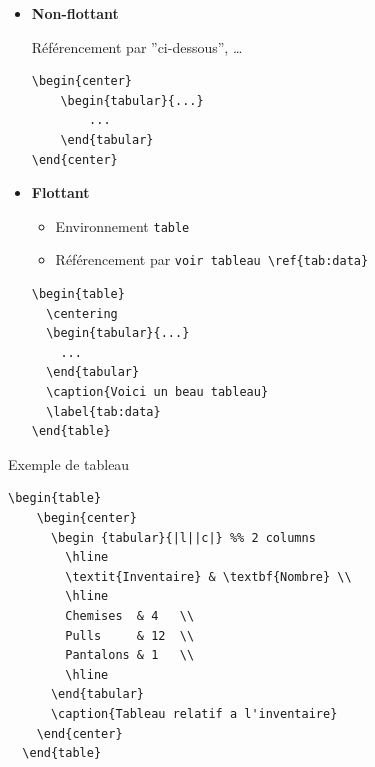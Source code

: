\begin{frame}
\begin{itemize}
      \item \textbf{Non-flottant}

    Référencement par ''ci-dessous'', \dots
    \begin{lstlisting}[style=nonumbers]
\begin{center}
    \begin{tabular}{...}
        ...
    \end{tabular}
\end{center}
    \end{lstlisting}

  \item \textbf{Flottant}
      \begin{itemize}
          \item Environnement \lstinline|table|
        \item Référencement par \lstinline|voir tableau \ref{tab:data}|
    \end{itemize}
    \begin{lstlisting}
\begin{table}
  \centering
  \begin{tabular}{...}
    ...
  \end{tabular}
  \caption{Voici un beau tableau}
  \label{tab:data}
\end{table}
    \end{lstlisting}
  \end{itemize}
\end{frame}

\begin{frame}[fragile]{Exemple de tableau}
  \begin{footnotesize}
  \begin{lstlisting}[style=nonumbers]
  \begin{table}
    \begin{center}
      \begin {tabular}{|l||c|} %% 2 columns
        \hline
        \textit{Inventaire} & \textbf{Nombre} \\
        \hline
        Chemises  & 4   \\
        Pulls     & 12  \\
        Pantalons & 1   \\
        \hline
      \end{tabular}
      \caption{Tableau relatif a l'inventaire}
    \end{center}
  \end{table}
  \end{lstlisting}
  \end{footnotesize}
  \begin{center}
  \end{center}
\end{frame}

